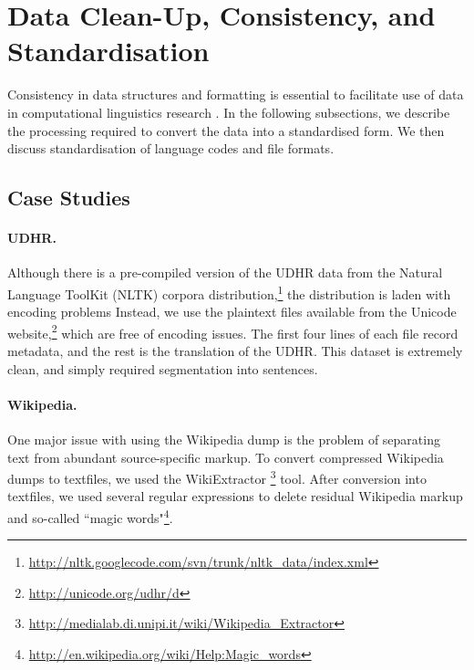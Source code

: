 \section{Data Clean-Up, Consistency, and Standardisation} \label{sec:case_studies}
Consistency in data structures and formatting is essential to facilitate use of data in computational linguistics research \cite{palmer2010lilt}. In the following subsections, we describe the processing required to convert the data into a standardised form.  We then discuss standardisation of language codes and file formats.

\subsection{Case Studies}


\paragraph{UDHR.} Although there is a pre-compiled version of the UDHR data from the
Natural Language ToolKit (NLTK) corpora
distribution,\footnote{\url{http://nltk.googlecode.com/svn/trunk/nltk\_data/index.xml}}
the distribution is laden with encoding problems 
Instead, we use the
plaintext files available from the Unicode
website,\footnote{\url{http://unicode.org/udhr/d}} which are free of
encoding issues. The first four lines of each file record metadata,
and the rest is the translation of the UDHR. This dataset is
extremely clean, and simply required segmentation into sentences.


\paragraph{Wikipedia.}
One major issue with using the Wikipedia dump is the problem of separating text from abundant source-specific markup. To convert compressed
Wikipedia dumps to textfiles, we used the WikiExtractor
\footnote{\url{http://medialab.di.unipi.it/wiki/Wikipedia\_Extractor}}
tool. After conversion into textfiles, we used several regular expressions to
delete residual Wikipedia markup and so-called ``magic
words"\footnote{\url{http://en.wikipedia.org/wiki/Help:Magic\_words}}.


